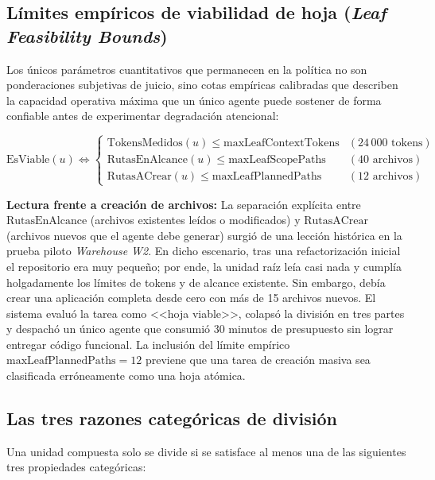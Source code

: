 \subsection{Límites empíricos de viabilidad de hoja (\emph{Leaf Feasibility Bounds})}

Los únicos parámetros cuantitativos que permanecen en la política no son ponderaciones subjetivas de juicio, sino cotas empíricas calibradas que describen la capacidad operativa máxima que un único agente puede sostener de forma confiable antes de experimentar degradación atencional:

\begin{equation}
\text{EsViable}(u) \iff 
\begin{cases}
\text{TokensMedidos}(u) \le \text{maxLeafContextTokens} & (24\,000\text{ tokens}) \\
\text{RutasEnAlcance}(u) \le \text{maxLeafScopePaths} & (40\text{ archivos}) \\
\text{RutasACrear}(u) \le \text{maxLeafPlannedPaths} & (12\text{ archivos})
\end{cases}
\label{eq:feasibility-bounds}
\end{equation}

\noindent\textbf{Lectura frente a creación de archivos:}
La separación explícita entre $\text{RutasEnAlcance}$ (archivos existentes leídos o modificados) y $\text{RutasACrear}$ (archivos nuevos que el agente debe generar) surgió de una lección histórica en la prueba piloto \emph{Warehouse W2}. En dicho escenario, tras una refactorización inicial el repositorio era muy pequeño; por ende, la unidad raíz leía casi nada y cumplía holgadamente los límites de tokens y de alcance existente. Sin embargo, debía crear una aplicación completa desde cero con más de 15 archivos nuevos. El sistema evaluó la tarea como <<hoja viable>>, colapsó la división en tres partes y despachó un único agente que consumió 30 minutos de presupuesto sin lograr entregar código funcional. La inclusión del límite empírico $\text{maxLeafPlannedPaths} = 12$ previene que una tarea de creación masiva sea clasificada erróneamente como una hoja atómica.

\subsection{Las tres razones categóricas de división}

Una unidad compuesta solo se divide si se satisface al menos una de las siguientes tres propiedades categóricas:

